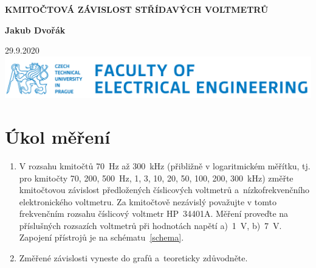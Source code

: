 \documentclass[a4paper,12pt]{article}   %
\begin{document}

\begin{titlepage}


    \begin{center}
        \vspace*{1cm}
            
        \Huge
        \textbf{KMITOČTOVÁ ZÁVISLOST STŘÍDAVÝCH VOLTMETRŮ}
            
        \vspace{0.5cm}
        \LARGE
        
            
        \vspace{1.5cm}
            
        \textbf{Jakub Dvořák}
            
        \vfill
            
        
            
        \vspace{0.8cm}
            
        
            
        \Large
        
        
            
        29.9.2020\\
        \vspace*{.5cm}
        \includegraphics[width=.4\textwidth]{logo-cvut-fee.png}\\
        
            
    \end{center}
\end{titlepage}

\setcounter{page}{0} %
\pagestyle{empty} %

\newpage
\section{Úkol měření}
\label{zadani}
\begin{enumerate}[label=\alph*)]
    \item V rozsahu kmitočtů 70~Hz až 300~kHz (přibližně v logaritmickém měřítku, tj. pro kmitočty 70, 200, 500~Hz, 1, 3, 10, 20, 50, 100, 200, 300~kHz) změřte kmitočtovou závislost předložených číslicových voltmetrů a~nízkofrekvenčního elektronického voltmetru. Za kmitočtově nezávislý považujte v tomto frekvenčním rozsahu číslicový voltmetr HP~34401A. Měření proveďte na příslušných rozsazích voltmetrů při hodnotách napětí a)~1~V, b)~7~V. Zapojení přístrojů je na schématu~\ref{schema}.
    \item Změřené závislosti vyneste do grafů a~teoreticky zdůvodněte.
\end{enumerate}
\end{document}
